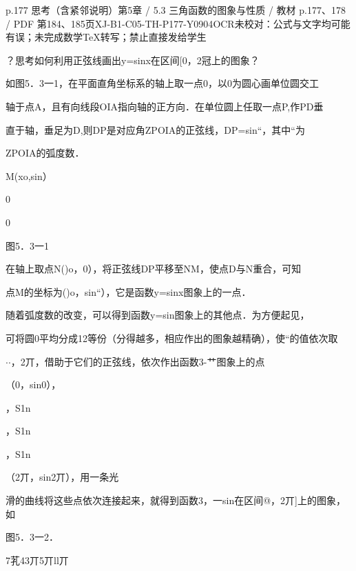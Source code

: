 \begin{bankitem}{p.177 思考（含紧邻说明）}{第5章 / 5.3 三角函数的图象与性质 / 教材 p.177、178 / PDF 第184、185页}{XJ-B1-C05-TH-P177-Y0904}{OCR未校对：公式与文字均可能有误；未完成数学TeX转写；禁止直接发给学生}
\begin{ocrdraft}
\par
？思考如何利用正弦线画出y=sinx在区间[0，2冠上的图象？
\par
如图5．3一1，在平面直角坐标系的轴上取一点0，以0为圆心画单位圆交工
\par
轴于点A，且有向线段OIA指向轴的正方向．在单位圆上任取一点P,作PD垂
\par
直于轴，垂足为D,则DP是对应角ZPOIA的正弦线，DP=sin“，其中“为
\par
ZPOIA的弧度数．
\par
M(xo,sin）
\par
0
\par
0
\par
图5．3一1
\par
在轴上取点N()o，0），将正弦线DP平移至NM，使点D与N重合，可知
\par
点M的坐标为()o，sin“），它是函数y=sinx图象上的一点．
\par
随着弧度数的改变，可以得到函数y=sin图象上的其他点．为方便起见，
\par
可将圆0平均分成12等份（分得越多，相应作出的图象越精确），使“的值依次取
\par
\ensuremath{\cdot}\ensuremath{\cdot}，2丌，借助于它们的正弦线，依次作出函数3-艹图象上的点
\par
[教材p.178 / PDF第185页]
\par
（0，sin0），
\par
，S1n
\par
，S1n
\par
，S1n
\par
（2丌，sin2丌），用一条光
\par
滑的曲线将这些点依次连接起来，就得到函数3，一sin在区间@，2丌]上的图象，如
\par
图5．3一2．
\par
7芤43丌5丌ll丌
\par

\end{ocrdraft}
\end{bankitem}
